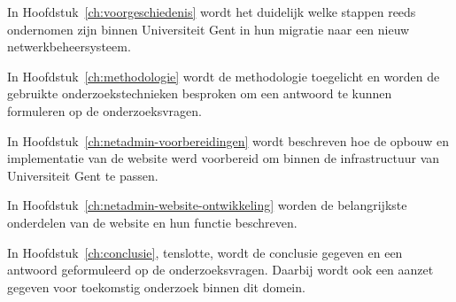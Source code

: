 In Hoofdstuk~\ref{ch:voorgeschiedenis} wordt het duidelijk welke stappen reeds ondernomen zijn binnen Universiteit Gent in hun migratie naar een nieuw netwerkbeheersysteem.

In Hoofdstuk~\ref{ch:methodologie} wordt de methodologie toegelicht en worden de gebruikte onderzoekstechnieken besproken om een antwoord te kunnen formuleren op de onderzoeksvragen.

In Hoofdstuk~\ref{ch:netadmin-voorbereidingen} wordt beschreven hoe de opbouw en implementatie van de website werd voorbereid om binnen de infrastructuur van Universiteit Gent te passen.

In Hoofdstuk~\ref{ch:netadmin-website-ontwikkeling} worden de belangrijkste onderdelen van de website en hun functie beschreven.

In Hoofdstuk~\ref{ch:conclusie}, tenslotte, wordt de conclusie gegeven en een antwoord geformuleerd op de onderzoeksvragen. Daarbij wordt ook een aanzet gegeven voor toekomstig onderzoek binnen dit domein.